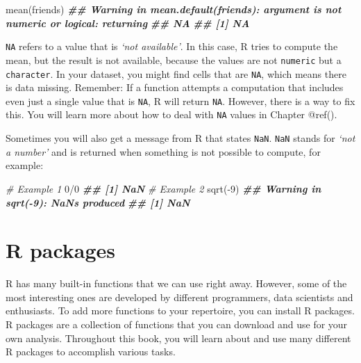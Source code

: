 \documentclass[
]{book}
\newenvironment{Shaded}{\begin{snugshade}}{\end{snugshade}}
\newcommand{\CommentTok}[1]{\textcolor[rgb]{0.56,0.35,0.01}{\textit{#1}}}
\newcommand{\DecValTok}[1]{\textcolor[rgb]{0.00,0.00,0.81}{#1}}
\newcommand{\DocumentationTok}[1]{\textcolor[rgb]{0.56,0.35,0.01}{\textbf{\textit{#1}}}}
\newcommand{\FunctionTok}[1]{\textcolor[rgb]{0.00,0.00,0.00}{#1}}
\newcommand{\NormalTok}[1]{#1}
\newcommand{\SpecialCharTok}[1]{\textcolor[rgb]{0.00,0.00,0.00}{#1}}
\begin{document}
\begin{Shaded}
\begin{Highlighting}[]
\FunctionTok{mean}\NormalTok{(friends)}
\DocumentationTok{\#\# Warning in mean.default(friends): argument is not numeric or logical: returning}
\DocumentationTok{\#\# NA}
\DocumentationTok{\#\# [1] NA}
\end{Highlighting}
\end{Shaded}

\texttt{NA} refers to a value that is \emph{`not available'}. In this case, R tries to compute the mean, but the result is not available, because the values are not \texttt{numeric} but a \texttt{character}. In your dataset, you might find cells that are \texttt{NA}, which means there is data missing. Remember: If a function attempts a computation that includes even just a single value that is \texttt{NA}, R will return \texttt{NA}. However, there is a way to fix this. You will learn more about how to deal with \texttt{NA} values in Chapter @ref().

Sometimes you will also get a message from R that states \texttt{NaN}. \texttt{NaN} stands for \emph{`not a number'} and is returned when something is not possible to compute, for example:

\begin{Shaded}
\begin{Highlighting}[]
\CommentTok{\# Example 1}
\DecValTok{0}\SpecialCharTok{/}\DecValTok{0}
\DocumentationTok{\#\# [1] NaN}
\CommentTok{\# Example 2}
\FunctionTok{sqrt}\NormalTok{(}\SpecialCharTok{{-}}\DecValTok{9}\NormalTok{)}
\DocumentationTok{\#\# Warning in sqrt({-}9): NaNs produced}
\DocumentationTok{\#\# [1] NaN}
\end{Highlighting}
\end{Shaded}

\hypertarget{r-packages}{%
\section{R packages}\label{r-packages}}

R has many built-in functions that we can use right away. However, some of the most interesting ones are developed by different programmers, data scientists and enthusiasts. To add more functions to your repertoire, you can install R packages. R packages are a collection of functions that you can download and use for your own analysis. Throughout this book, you will learn about and use many different R packages to accomplish various tasks.
\end{document}
